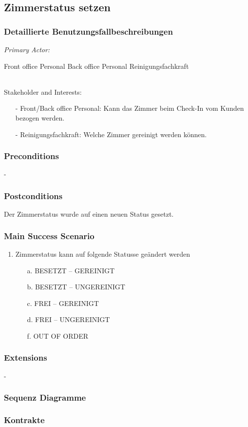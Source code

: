 \documentclass[./detailed_overview_usecases.tex]{subfiles}
\begin{document}
    \subsection{Zimmerstatus setzen}
    \subsubsection{Detaillierte Benutzungsfallbeschreibungen}
    \textit{Primary Actor:}
    \begin{enumerate}
        Front office Personal
        Back office Personal
        Reinigungsfachkraft
    \end{enumerate}
    \\
    Stakeholder and Interests:
    \begin{itemize}
        \item[-] Front/Back office Personal: Kann das Zimmer beim Check-In vom Kunden bezogen werden.
        \item[-] Reinigungsfachkraft: Welche Zimmer gereinigt werden können.
    \end{itemize}

    \subsubsection*{Preconditions}
    -
    \subsubsection*{Postconditions}
    Der Zimmerstatus wurde auf einen neuen Status gesetzt.

    \subsubsection*{Main Success Scenario}
    \begin{enumerate}
        \item Zimmerstatus kann auf folgende Statusse geändert werden
        \begin{itemize}
            \item[a.] BESETZT – GEREINIGT
            \item[b.] BESETZT – UNGEREINIGT
            \item[c.] FREI – GEREINIGT
            \item[d.] FREI – UNGEREINIGT
            \item[f.] OUT OF ORDER
        \end{itemize}
    \end{enumerate}

    \subsubsection*{Extensions}
    -

    \subsubsection{Sequenz Diagramme}
    \subsubsection{Kontrakte}
\end{document}

